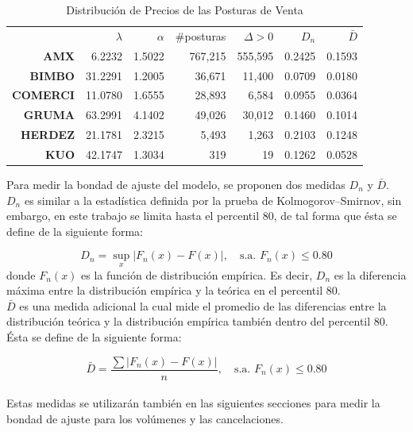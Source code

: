 \documentclass[11pt]{article}
\numberwithin{equation}{section} %
\begin{document}
\begin{table}[htbp]
\centering
\caption{Distribución de Precios de las Posturas de Venta}
\renewcommand{\arraystretch}{1.2}
\begin{tabular}{r|r|r|r|r|r|r|}
\cline{2-7}
& $\lambda$ & $\alpha$ & \#posturas & $\Delta>0$ & $D_n$ & $\bar{D}$  \\
\cline{2-7}
\textbf{AMX}   & 6.2232 & 1.5022 & 767,215 & 555,595 & 0.2425 & 0.1593 \\
\textbf{BIMBO} & 31.2291 & 1.2005 & 36,671 & 11,400 & 0.0709 & 0.0180 \\
\textbf{COMERCI}   & 11.0780 & 1.6555 & 28,893 & 6,584 & 0.0955 & 0.0364 \\
\textbf{GRUMA} & 63.2991 & 4.1402 & 49,026 & 30,012 & 0.1460 & 0.1014 \\
\textbf{HERDEZ} & 21.1781 & 2.3215 & 5,493 & 1,263 & 0.2103 & 0.1248 \\
\textbf{KUO}   & 42.1747 & 1.3034 & 319   & 19 & 0.1262 & 0.0528 \\
\cline{2-7}
\end{tabular}%
\label{tab:powerventa}%
\end{table}%

Para medir la bondad de ajuste del modelo, se proponen dos medidas $D_n$ y $\bar{D}$. $D_n$ es similar a la estadística definida por la prueba de Kolmogorov–Smirnov, sin embargo, en este trabajo se limita hasta el percentil 80, de tal forma que ésta se define de la siguiente forma:

\[
D_n=\sup_x |F_n(x)-F(x)|,\quad \text{s.a. } F_n(x)\leq 0.80
\]
donde $F_n(x)$ es la función de distribución empírica. Es decir, $D_n$ es la diferencia máxima entre la distribución empírica y la teórica en el percentil 80.\\

$\bar{D}$ es una medida adicional la cual mide el promedio de las diferencias entre la distribución teórica y la distribución empírica también dentro del percentil 80. Ésta se define de la siguiente forma:

\[
\bar{D}=\frac{\sum |F_n(x)-F(x)|}{n},\quad \text{s.a. } F_n(x)\leq 0.80
\]\\

Estas medidas se utilizarán también en las siguientes secciones para medir la bondad de ajuste para los volúmenes y las cancelaciones.\\
\end{document}
